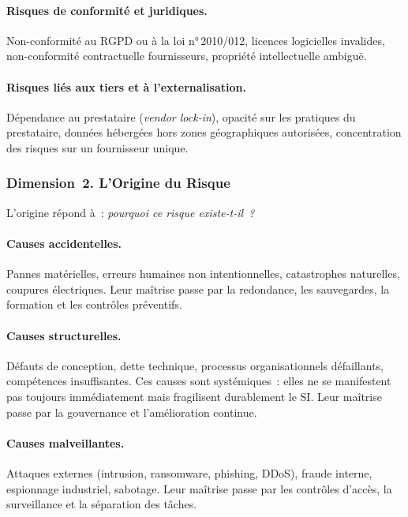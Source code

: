 \paragraph{Risques de conformité et juridiques.}
Non-conformité au RGPD ou à la loi n°\,2010/012, licences logicielles invalides,
non-conformité contractuelle fournisseurs, propriété intellectuelle ambiguë.

\paragraph{Risques liés aux tiers et à l'externalisation.}
Dépendance au prestataire (\emph{vendor lock-in}), opacité sur les pratiques du
prestataire, données hébergées hors zones géographiques autorisées, concentration
des risques sur un fournisseur unique.

\subsubsection{Dimension~2. L'Origine du Risque}

L'origine répond à~: \emph{pourquoi ce risque existe-t-il~?}

\paragraph{Causes accidentelles.}
Pannes matérielles, erreurs humaines non intentionnelles, catastrophes naturelles,
coupures électriques. Leur maîtrise passe par la redondance, les sauvegardes, la
formation et les contrôles préventifs.

\paragraph{Causes structurelles.}
Défauts de conception, dette technique, processus organisationnels défaillants,
compétences insuffisantes. Ces causes sont systémiques~: elles ne se manifestent pas
toujours immédiatement mais fragilisent durablement le SI. Leur maîtrise passe par
la gouvernance et l'amélioration continue.

\paragraph{Causes malveillantes.}
Attaques externes (intrusion, ransomware, phishing, DDoS), fraude interne,
espionnage industriel, sabotage. Leur maîtrise passe par les contrôles d'accès,
la surveillance et la séparation des tâches.

